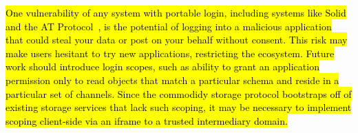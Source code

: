 \hl{%
One vulnerability of any system with portable login,
including systems like Solid and the AT Protocol~{\cite{bluesky}},
is the potential of logging into
a malicious application that could steal your data or
post on your behalf without consent.
This risk may make users hesitant to try new applications,
restricting the ecosystem.
Future work should introduce login scopes, such as
ability to grant an application permission only to read objects
that match a particular schema and reside in a particular set of channels.
Since the commodidy storage protocol bootstraps off of
existing storage services that lack such scoping,
it may be necessary to implement scoping client-side
via an iframe to a trusted intermediary domain.
}%




